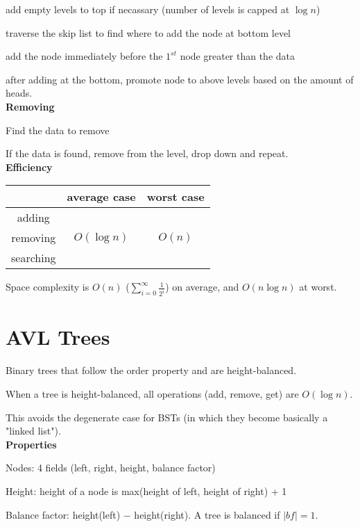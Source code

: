 \documentclass{exam}
\begin{document}
    \quad add empty levels to top if necassary (number of levels is capped at $\log n$)
    
    \quad traverse the skip list to find where to add the node at bottom level
    
    \quad\quad add the node immediately before the $1^{st}$ node greater than the data
    
    \quad\quad after adding at the bottom, promote node to above levels based on the amount of heads.\\
    
    \textbf{Removing}
    
    Find the data to remove
    
    If the data is found, remove from the level, drop down and repeat.\\
    
    \textbf{Efficiency}
    
    \begin{tabular}{c|c|c}
        &average case&worst case\\
        \hline
        adding&&\\
        removing&$O(\log n)$&$O(n)$\\
        searching&&\\      
    \end{tabular}

Space complexity is $O(n)$ ($\sum_{i=0}^{\infty} \frac{1}{2^i}$) on average, and $O(n \log n)$ at worst.

    \newpage
    \section{AVL Trees}
    
    Binary trees that follow the order property and are height-balanced.
    
    When a tree is height-balanced, all operations (add, remove, get) are $O(\log n)$.
    
    This avoids the degenerate case for BSTs (in which they become basically a "linked list").\\
    
    \textbf{Properties}
    
    Nodes: 4 fields (left, right, height, balance factor)
    
    Height: height of a node is  max(height of left, height of right) + 1
    
    Balance factor: height(left) $-$ height(right). A tree is balanced if $|bf| = 1$.\\
    
\end{document}
